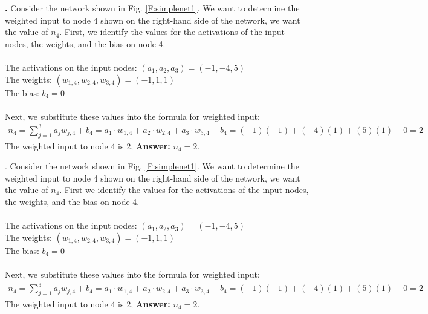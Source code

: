 
\noindent
{\bf \theActFunctionCounter.}  Consider the network shown in Fig. \ref{F:simplenet1}. We want to determine the weighted 
input to node 4 shown on the right-hand side of the network, \ie we want the
value of $n_4$. First, we identify the values for the activations of the input 
nodes, the weights, and the bias on node 4. \\ \\
\indent \qquad\qquad The activations on the input nodes: $(a_1,a_2,a_3) = 
(-1,-4,5)$ \\
\indent \qquad\qquad The weights: $(w_{1,4}, w_{2,4}, w_{3,4}) = (-1,1,1)$ \\
\indent \qquad\qquad The bias: $b_4 = 0$ \\ \\
Next, we substitute these values into the formula for weighted input:
\begin{eqnarray*}
n_4 = \sum_{j=1}^{3}  a_j  w_{j,4} + b_4 
    =  a_1 \cdot w_{1,4} + a_2 \cdot w_{2,4} + a_3 \cdot w_{3,4} + b_4 
    =      (-1)(-1)      +      (-4)(1)      +       (5)(1)      + 0 
    = 2
\end{eqnarray*}
The weighted input to node 4 is $2$, {\bf Answer:} $n_4=2$.
\bigskip

\noindent

\label{actFunctEx1}
\noindent
{\bf \theActFunctionCounter}. Consider the network shown in Fig. \ref{F:simplenet1}. We want to determine the weighted 
input to node 4 shown on the right-hand side of the network, \ie we want the
value of $n_4$. First we identify the values for the activations of the input 
nodes, the weights, and the bias on node 4. \\ \\
\indent \qquad\qquad The activations on the input nodes: $(a_1,a_2,a_3) = 
(-1,-4,5)$ \\
\indent \qquad\qquad The weights: $(w_{1,4}, w_{2,4}, w_{3,4}) = (-1,1,1)$ \\
\indent \qquad\qquad The bias: $b_4 = 0$ \\ \\
Next, we substitute these values into the formula for weighted input:
\begin{eqnarray*}
n_4 = \sum_{j=1}^{3}  a_j  w_{j,4} + b_4 
    =  a_1 \cdot w_{1,4} + a_2 \cdot w_{2,4} + a_3 \cdot w_{3,4} + b_4 
    =      (-1)(-1)      +      (-4)(1)      +       (5)(1)      + 0 
    = 2
\end{eqnarray*}
The weighted input to node 4 is $2$, {\bf Answer:} $n_4=2$.


